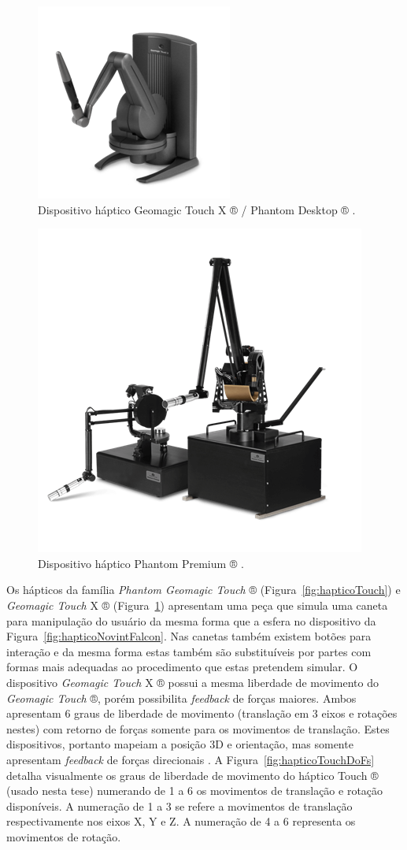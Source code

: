 \begin{figure}[ht!]
    \centering
    \includegraphics[width=0.4\linewidth]{capitulos/figuras/hapticoTouchX.png}
    \caption{Dispositivo háptico Geomagic Touch X ® / Phantom Desktop ® \cite{3DSystems2018}.}
    \label{fig:hapticoTouchX}
\end{figure}


\begin{figure}[ht!]
    \centering
    \includegraphics[width=0.4\linewidth]{capitulos/figuras/hapticoPhantomPremium.png}
    \caption{Dispositivo háptico Phantom Premium ® \cite{3DSystems2018}.}
    \label{fig:hapticoPremium}
\end{figure}

Os hápticos da família \textit{Phantom Geomagic Touch} ® (Figura~\ref{fig:hapticoTouch}) e \textit{Geomagic Touch} X ® (Figura~\ref{fig:hapticoTouchX}) apresentam uma peça que simula uma caneta para manipulação do usuário da mesma forma que a esfera no dispositivo da Figura~\ref{fig:hapticoNovintFalcon}. Nas canetas também existem botões para interação e da mesma forma estas também são substituíveis por partes com formas mais adequadas ao procedimento que estas pretendem simular. O dispositivo \textit{Geomagic Touch} X ® possui a mesma liberdade de movimento do \textit{Geomagic Touch} ®, porém possibilita \textit{feedback} de forças maiores. Ambos apresentam 6 graus de liberdade de movimento (translação em 3 eixos e rotações nestes) com retorno de forças somente para os movimentos de translação. Estes dispositivos, portanto mapeiam a posição 3D e orientação, mas somente apresentam \textit{feedback} de forças direcionais \cite{Forsslund2013}. A Figura~\ref{fig:hapticoTouchDoFs} detalha visualmente os graus de liberdade de movimento do háptico Touch ® (usado nesta tese) numerando de 1 a 6 os movimentos de translação e rotação disponíveis. A numeração de 1 a 3 se refere a movimentos de translação respectivamente nos eixos X, Y e Z. A numeração de 4 a 6 representa os movimentos de rotação.

